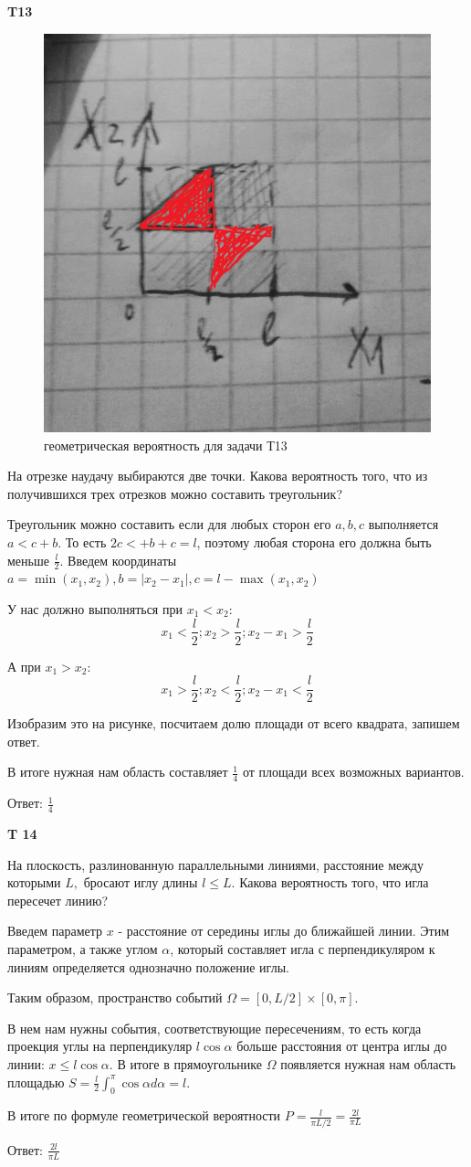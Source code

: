 \documentclass[a4paper,12pt]{article} %
\begin{document}
\begin{example}\textbf{T13}


\begin{figure}[h!]
\centering
\includegraphics[width=0.2\linewidth]{t13}
\caption{геометрическая вероятность для задачи Т13}
\label{fig:t13}
\end{figure}

На отрезке наудачу выбираются две точки. 
Какова вероятность того, что из получившихся трех отрезков можно составить треугольник?

Треугольник можно составить если для любых сторон его $ a,b,c$ выполняется $ a<c+b$. 
То есть $ 2c<+b+c=l$, поэтому любая сторона его должна быть меньше $\frac{l}{2}$.
Введем координаты $ a=\min (x_1, x_2), b=|x_2-x_1|, c=l -\max (x_1, x_2)$

У нас должно выполняться при $ x_1<x_2 $:
\[ x_1<\frac{l}{2}; x_2>\frac{l}{2}; x_2-x_1> \frac{l}{2} \]

А при $ x_1>x_2 $:
\[ x_1>\frac{l}{2}; x_2<\frac{l}{2}; x_2-x_1< \frac{l}{2} \]



Изобразим это на рисунке, посчитаем долю площади от всего квадрата, запишем ответ.


В итоге нужная нам область составляет $ \frac{1}{4}$ от площади всех возможных вариантов.

Ответ: $ \frac{1}{4}$

\end{example}




\begin{example}\textbf{T 14}

На плоскость, разлинованную параллельными линиями, расстояние между которыми $L,$ бросают иглу длины $l \leqslant L .$ 
Какова вероятность того, что игла пересечет линию?

Введем параметр $x$ - расстояние от середины иглы до ближайшей линии. 
Этим параметром, а также углом $\alpha$, который составляет игла с перпендикуляром к линиям определяется однозначно положение иглы.

Таким образом, пространство событий $ \Omega=[0,L/2]\times[0,\pi]$.

В нем нам нужны события, соответствующие пересечениям, то есть когда проекция углы на перпендикуляр $ l\cos\alpha$ больше расстояния от центра иглы до линии: $ x\le l\cos\alpha$.
В итоге в прямоугольнике $\Omega$ появляется нужная нам область площадью $ S=\frac{l}{2}\int_0^{\pi} \cos\alpha d \alpha=l$.

В итоге по формуле геометрической вероятности $ P=\frac{l}{\pi L/2}=\frac{2l}{\pi L} $


Ответ: $\frac{2l}{\pi L}$

\end{example}
\end{document}
